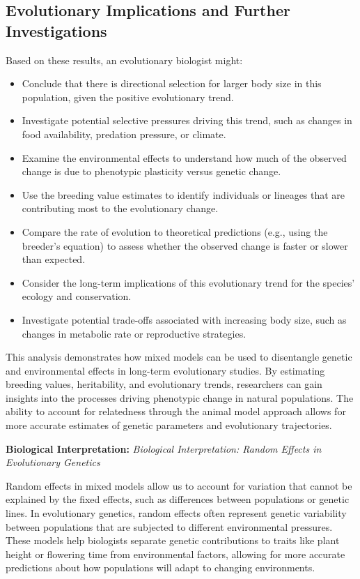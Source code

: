 \documentclass[12pt,a4paper]{article}
\newenvironment{interpretation}[1][]
{\begin{basebox}[linecolor=uqgreen]
\textbf{\color{uqgreen}Biological Interpretation:} \textit{#1}\par\noindent\ignorespaces}
{\end{basebox}}
\begin{document}
\subsection{Evolutionary Implications and Further Investigations}

Based on these results, an evolutionary biologist might:

\begin{itemize}
    \item Conclude that there is directional selection for larger body size in this population, given the positive evolutionary trend.
    \item Investigate potential selective pressures driving this trend, such as changes in food availability, predation pressure, or climate.
    \item Examine the environmental effects to understand how much of the observed change is due to phenotypic plasticity versus genetic change.
    \item Use the breeding value estimates to identify individuals or lineages that are contributing most to the evolutionary change.
    \item Compare the rate of evolution to theoretical predictions (e.g., using the breeder's equation) to assess whether the observed change is faster or slower than expected.
    \item Consider the long-term implications of this evolutionary trend for the species' ecology and conservation.
    \item Investigate potential trade-offs associated with increasing body size, such as changes in metabolic rate or reproductive strategies.
\end{itemize}

This analysis demonstrates how mixed models can be used to disentangle genetic and environmental effects in long-term evolutionary studies. By estimating breeding values, heritability, and evolutionary trends, researchers can gain insights into the processes driving phenotypic change in natural populations. The ability to account for relatedness through the animal model approach allows for more accurate estimates of genetic parameters and evolutionary trajectories.

\begin{interpretation}[Biological Interpretation: Random Effects in Evolutionary Genetics]
Random effects in mixed models allow us to account for variation that cannot be explained by the fixed effects, such as differences between populations or genetic lines. In evolutionary genetics, random effects often represent genetic variability between populations that are subjected to different environmental pressures. These models help biologists separate genetic contributions to traits like plant height or flowering time from environmental factors, allowing for more accurate predictions about how populations will adapt to changing environments.
\end{interpretation}
\end{document}
